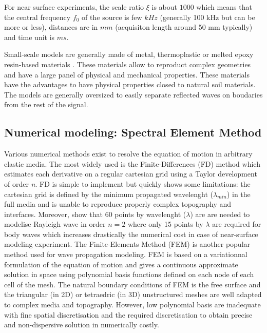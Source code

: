 \documentclass[manuscript,revised]{geophysics}
\begin{document}
\noindent For near surface experiments, the scale ratio $\xi$ is about $1000$ which means that the central frequency $f_{0}$ of the source is few $kHz$ (generally 100 kHz but can be more or less), distances are in $mm$ (acquisiton length around 50 mm typically) and time unit is $ms$.

\noindent Small-scale models are generally made of metal, thermoplastic or melted epoxy resin-based materials \citep{Bretaudeau_FWI_2013,Bretaudeau_SSM_2011,Bretaudeau_SSA_2008b}. These materials allow to reproduct complex geometries and have a large panel of physical and mechanical properties. These materials have the advantages to have physical properties closed to natural soil materials. The models are generally oversized to easily separate reflected waves on boudaries from the rest of the signal. 

\subsection{Numerical modeling: Spectral Element Method}

\noindent Various numerical methods exist to resolve the equation of motion in arbitrary elastic media. The most widely used is the Finite-Differences (FD) method \citep{Virieux_PSV_1986,Levander_PSV_1988,Robertsson_FDM_1994,Pratt_EWM_1990,Stekl_VEM_1998,Saenger_FDM_2004} which estimates each derivative on a regular cartesian grid using a Taylor development \citep{Moczo_FDM_2004} of order \textit{n}. FD is simple to implement but quickly shows some limitations: the cartesian grid is defined by the minimum propagated wavelenght ($\lambda_{min}$) in the full media and is unable to reproduce properly complex topography and interfaces. Moreover, \citet{Saenger_FDM_2000} show that 60 points by wavelenght ($\lambda$) are are needed to modelise Rayleigh wave in order $n=2$ where only 15 points by $\lambda$ are required for body waves which increases drastically the numerical cost in case of near-surface modeling experiment. The Finite-Elements Method (FEM) is another popular method used for wave propagation modeling. FEM is based on a variationnal formulation of the equation of motion and gives a continuous approximate solution in space using polynomial basis functions defined on each node of each cell of the mesh. The natural boundary conditions of FEM is the free surface and the triangular (in 2D) or tetraedric (in 3D) unstructured meshes are well adapted to complex media and topography. However, low polynomial basis are inadequate with fine spatial discretisation and the required discretisation to obtain precise and non-dispersive solution in numerically costly. 
\end{document}
